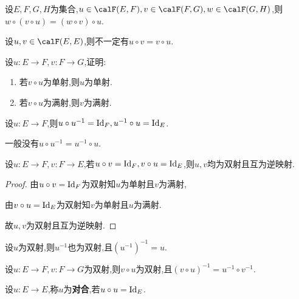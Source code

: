 \begin{exer}
    设$E, F, G, H$为集合,$u \in \calF(E, F), v \in \calF(F, G), w \in \calF(G, H)$,则$w \circ (v \circ u) = (w \circ v) \circ u$.
\end{exer}

\begin{rqq}
    设$u, v \in \calF(E, E)$,则不一定有$u \circ v = v \circ u$.
\end{rqq}

\begin{exer}
    设$u: E \to F, v: F \to G$,证明:
    \begin{enumerate}
        \item 若$v \circ u$为单射,则$u$为单射.
        \item 若$v \circ u$为满射,则$v$为满射.
    \end{enumerate}
\end{exer}

\begin{prop}
    设$u: E \to F$,则$u \circ u^{-1} = \operatorname{Id}_F, u^{-1} \circ u = \operatorname{Id}_E$.
\end{prop}

\begin{rqq}
    一般没有$u \circ u^{-1} = u^{-1} \circ u$.
\end{rqq}

\begin{lem}
    设$u: E \to F, v: F \to E$,若$u \circ v = \operatorname{Id}_F, v \circ u = \operatorname{Id}_E$,则$u, v$均为双射且互为逆映射.
\end{lem}

\begin{proof}
    由$u \circ v = \operatorname{Id}_F$为双射知$u$为单射且$v$为满射,

    由$v \circ u = \operatorname{Id}_E$为双射知$v$为单射且$u$为满射.

    故$u,v$为双射且互为逆映射.
\end{proof}

\begin{prop}
    设$u$为双射,则$u^{-1}$也为双射,且$\left( u^{-1} \right)^{-1} = u$.
\end{prop}

\begin{prop}
    设$u: E \to F, v: F \to G$为双射,则$v \circ u$为双射,且$(v \circ u)^{-1} = u^{-1} \circ v^{-1}$.
\end{prop}

\begin{deff}
    设$u: E \to E$,称$u$为\textbf{对合},若$u \circ u = \operatorname{Id}_E$.
\end{deff}

